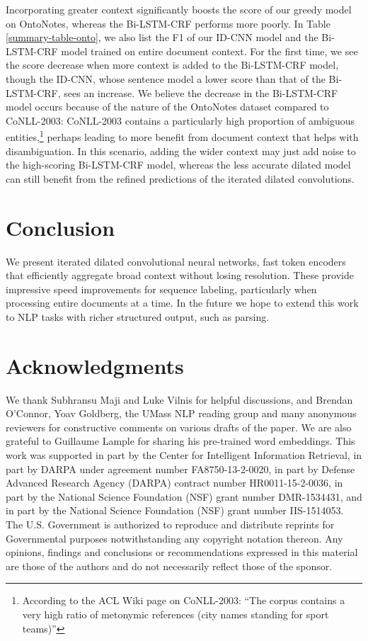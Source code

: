 \documentclass[11pt,letterpaper]{article}
\begin{document}
Incorporating greater context significantly boosts the score of our greedy model on OntoNotes, whereas the Bi-LSTM-CRF performs more poorly. In Table \ref{summary-table-onto}, we also list the F1 of our ID-CNN model and the Bi-LSTM-CRF model trained on entire document context. For the first time, we see the score decrease when more context is added to the Bi-LSTM-CRF model, though the ID-CNN, whose sentence model a lower score than that of the Bi-LSTM-CRF, sees an increase. We believe the decrease in the Bi-LSTM-CRF model occurs because of the nature of the OntoNotes dataset compared to CoNLL-2003: CoNLL-2003 contains a particularly high proportion of ambiguous entities,\footnote{According to the ACL Wiki page on CoNLL-2003: ``The corpus contains a very high ratio of metonymic references (city names standing for sport teams)''} perhaps leading to more benefit from document context that helps with disambiguation. In this scenario, adding the wider context may just add noise to the high-scoring Bi-LSTM-CRF model, whereas the less accurate dilated model can still benefit from the refined predictions of the iterated dilated convolutions. 
\section{Conclusion}

We present iterated dilated convolutional neural networks, fast token encoders that efficiently aggregate broad context without losing resolution. These provide impressive speed improvements for sequence labeling, particularly when processing entire documents at a time. In the future we hope to extend this work to NLP tasks with richer structured output, such as parsing.

\section*{Acknowledgments}
We thank Subhransu Maji and Luke Vilnis for helpful discussions, and Brendan O'Connor, Yoav Goldberg, the UMass NLP reading group and many anonymous reviewers for constructive comments on various drafts of the paper. We are also grateful to Guillaume Lample for sharing his pre-trained word embeddings. This work was supported in part by the Center for Intelligent Information Retrieval, in part by DARPA under agreement number FA8750-13-2-0020, in part by Defense Advanced Research Agency (DARPA) contract number HR0011-15-2-0036, in part by the National Science Foundation (NSF) grant number DMR-1534431, and in part by the National Science Foundation (NSF) grant number IIS-1514053. The U.S. Government is authorized to reproduce and distribute reprints for Governmental purposes notwithstanding any copyright notation thereon. Any opinions, findings and conclusions or recommendations expressed in this material are those of the authors and do not necessarily reflect those of the sponsor.
\end{document}
